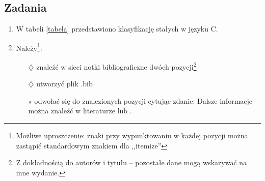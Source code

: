 \documentclass[a4paper,11pt]{article}
\begin{document}
	\subsection{Zadania}
	\begin{enumerate}
		\item W tabeli \ref{tabela} przedstawiono klasyfikację stałych w języku C.
		\begin{table}[h]
			\caption{Stałe w języku C}
			\label{tabela}
		\end{table}
		\item Należy\footnote{Możliwe uproszczenie: znaki przy wypunktowaniu w każdej pozycji można zastąpić standardowym znakiem dla ,,itemize''}:
		\begin{itemize}
			\item[$\diamondsuit$] znaleźć w sieci notki bibliograficzne dwóch pozycji\footnote{Z dokładnością do autorów i tytułu -- pozostałe dane mogą wskazywać na inne wydanie.}
			\item[$\diamondsuit$] utworzyć plik .bib
			\item[$\star$] odwołać się do znalezionych pozycji cytując zdanie:
			\subitem Dalsze informacje można znaleźć w literaturze \cite{kahneman2011thinking} lub \cite{Kernighan88}.
		\end{itemize}

	\end{enumerate}

	
\end{document}
